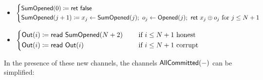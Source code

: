 \begin{itemize}
\item {\color{red} $\begin{cases*} \SumOpened(0) \coloneqq \ret{\false} \\ \SumOpened(j+1) \coloneqq x_j \leftarrow \SumOpened(j); \ o_j \leftarrow \Opened(j); \ \ret{x_j \oplus o_j} \text{ for $j \leq N+1$} \end{cases*}$}
\item $\begin{cases*} \Out(i) \coloneqq \read{\SumOpened(N+2)} & \hspace{10pt} \text{if $i \leq N+1$ honest} \\ \Out(i) \coloneqq \read{\Out(i)} & \hspace{10pt} \text{if $i \leq N+1$ corrupt} \end{cases*}$
\end{itemize}

\noindent In the presence of these new channels, the channels $\mathsf{AllCommitted}(-)$ can be simplified:

